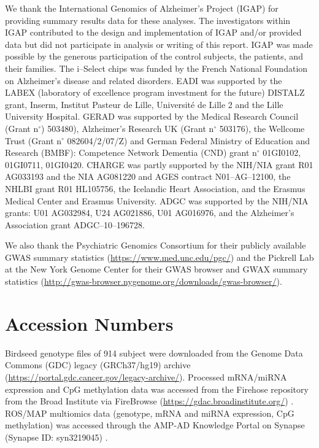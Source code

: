 We thank the International Genomics of
Alzheimer's Project (IGAP) for providing
summary results data for these analyses.
The investigators within IGAP contributed
to the design and implementation of IGAP
and/or provided data but did not
participate in analysis or writing of
this report. IGAP was made possible by
the generous participation of the control
subjects, the patients, and their
families. The i–Select chips was funded
by the French National Foundation on
Alzheimer's disease and related
disorders. EADI was supported by the
LABEX (laboratory of excellence program
investment for the future) DISTALZ grant,
Inserm, Institut Pasteur de Lille,
Université de Lille 2 and the Lille
University Hospital. GERAD was supported
by the Medical Research Council 
(Grant n$^\circ$)
503480), Alzheimer's Research UK (Grant
n$^\circ$ 503176), the Wellcome Trust
(Grant n$^\circ$ 082604/2/07/Z) and
German Federal Ministry of Education and
Research (BMBF): Competence Network
Dementia (CND) grant n$^\circ$ 01GI0102,
01GI0711, 01GI0420. CHARGE was partly
supported by the NIH/NIA grant R01
AG033193 and the NIA AG081220 and AGES
contract N01–AG–12100, the NHLBI grant
R01 HL105756, the Icelandic Heart
Association, and the Erasmus Medical
Center and Erasmus University. ADGC was
supported by the NIH/NIA grants: U01
AG032984, U24 AG021886, U01 AG016976,
and the Alzheimer's Association grant
ADGC–10–196728.

We also thank the
Psychiatric Genomics Consortium
for their publicly
available GWAS summary statistics
(\url{https://www.med.unc.edu/pgc/})
and the
Pickrell Lab at the
New York Genome Center for
their GWAS browser
and GWAX summary statistics
(\url{http://gwas-browser.nygenome.org/downloads/gwas-browser/}).
 


\section{Accession Numbers}

Birdseed genotype files of 914 subject were downloaded
from the Genome Data Commons (GDC)
legacy (GRCh37/hg19) archive
(\url{https://portal.gdc.cancer.gov/legacy-archive/}).
Processed mRNA/miRNA expression
and CpG methylation data was
accessed from the Firehose repository
from the Broad Institute via FireBrowse
(\url{https://gdac.broadinstitute.org/}) \cite{Weinstein2013TheProject}.
ROS/MAP multiomics data (genotype,
mRNA and miRNA expression, CpG methylation)
was accessed through 
the AMP-AD Knowledge
Portal on Synapse (Synapse ID: syn3219045) \cite{DeJager2018DataResearch}.